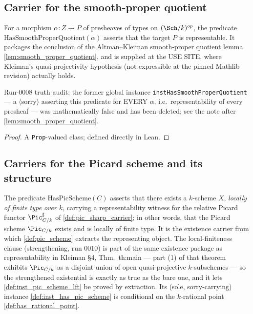\subsection{Carrier for the smooth-proper quotient}
\label{subsec:fga_pic_quotient_carrier}

\begin{definition}
  \label{def:has_smooth_proper_quotient}
  For a morphism \(\alpha : Z \to P\) of presheaves of types on
  \((\Sch/k)^{op}\), the predicate \(\mathrm{HasSmoothProperQuotient}(\alpha)\) asserts
  that the target \(P\) is representable. It packages the conclusion of the
  Altman--Kleiman smooth-proper quotient lemma
  \cref{lem:smooth_proper_quotient}, and is supplied at the USE SITE, where
  Kleiman's quasi-projectivity hypothesis (not expressible at the pinned
  Mathlib revision) actually holds.

  Run-0008 truth audit: the former global instance
  \texttt{instHasSmoothProperQuotient} --- a \(\langle\)sorry\(\rangle\)
  asserting this predicate for EVERY \(\alpha\), i.e.\ representability of
  every presheaf --- was mathematically false and has been deleted; see the
  note after \cref{lem:smooth_proper_quotient}.
\end{definition}

\begin{proof}\leanok
  A \texttt{Prop}-valued class; defined directly in Lean.
\end{proof}

\subsection{Carriers for the Picard scheme and its structure}
\label{subsec:fga_pic_scheme_carriers}

\begin{definition}
  \label{def:has_pic_scheme}
  The predicate \(\mathrm{HasPicScheme}(C)\) asserts that there exists a \(k\)-scheme
  \(X\), \emph{locally of finite type over \(k\)}, carrying a
  representability witness for the relative Picard functor
  \(\Pic^\sharp_{C/k}\) of \cref{def:pic_sharp_carrier}; in other words,
  that the Picard scheme \(\Pic_{C/k}\) exists and is locally of finite
  type. It is the existence carrier from which \cref{def:pic_scheme}
  extracts the representing object. The local-finiteness clause
  (strengthening, run 0010) is part of the same existence package as
  representability in Kleiman \S 4, Thm.~th:main --- part (1) of that
  theorem exhibits \(\Pic_{C/k}\) as a disjoint union of open
  quasi-projective \(k\)-subschemes --- so the strengthened existential is
  exactly as true as the bare one, and it lets
  \cref{def:inst_pic_scheme_lft} be proved by extraction. Its (sole,
  sorry-carrying) instance \cref{def:inst_has_pic_scheme} is conditional on
  the \(k\)-rational point \cref{def:has_rational_point}.
\end{definition}

